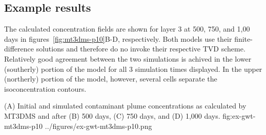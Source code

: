 

\subsection{Example results}

The calculated concentration fields are shown for layer 3 at 500, 750, and 1,00 days in figures~\ref{fig:mt3dms-p10}B-D, respectively.  Both models use their finite-difference solutions and therefore do no invoke their respective TVD scheme.  Relatively good agreement between the two simulations is achived in the lower (southerly) portion of the model for all 3 simulation times displayed.  In the upper (northerly) portion of the model, however, several cells separate the isoconcentration contours.

\begin{StandardFigure}
	{(A) Initial and simulated contaminant plume concentrations as calculated by MT3DMS and \mf after (B) 500 days, (C) 750 days, and (D) 1,000 days.} 
	{fig:ex-gwt-mt3dms-p10}
	{../figures/ex-gwt-mt3dms-p10.png}
\end{StandardFigure}
